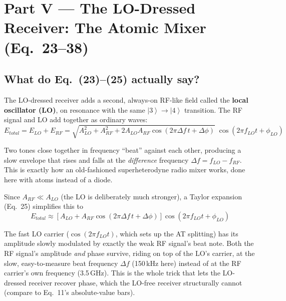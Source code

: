 \documentclass[11pt]{article}
\newcommand{\ket}[1]{\left|#1\right\rangle}
\begin{document}
\section{Part V --- The LO-Dressed Receiver: The Atomic Mixer (Eq.~23--38)}

\begin{center}
\end{center}

\subsection*{What do Eq.~(23)--(25) actually say?}
The LO-dressed receiver adds a second, always-on RF-like field called the \textbf{local oscillator (LO)}, on resonance with the same $\ket3\to\ket4$ transition. The RF signal and LO add together as ordinary waves:
\[
E_{total}=E_{LO}+E_{RF} = \sqrt{A_{LO}^2+A_{RF}^2+2A_{LO}A_{RF}\cos(2\pi\Delta f\,t+\Delta\phi)}\;\cos(2\pi f_{LO}t+\phi_{LO})
\]
\begin{plain}
Two tones close together in frequency ``beat'' against each other, producing a slow envelope that rises and falls at the \emph{difference} frequency $\Delta f=f_{LO}-f_{RF}$. This is exactly how an old-fashioned superheterodyne radio mixer works, done here with atoms instead of a diode.
\end{plain}
Since $A_{RF}\ll A_{LO}$ (the LO is deliberately much stronger), a Taylor expansion (Eq.~25) simplifies this to
\[
E_{total}\approx[A_{LO}+A_{RF}\cos(2\pi\Delta f\,t+\Delta\phi)]\cos(2\pi f_{LO}t+\phi_{LO})
\]
\begin{eqmeaning}
The fast LO carrier ($\cos(2\pi f_{LO}t)$, which sets up the AT splitting) has its amplitude slowly modulated by exactly the weak RF signal's beat note. Both the RF signal's amplitude \emph{and} phase survive, riding on top of the LO's carrier, at the slow, easy-to-measure beat frequency $\Delta f$ (150\,kHz here) instead of at the RF carrier's own frequency (3.5\,GHz). This is the whole trick that lets the LO-dressed receiver recover phase, which the LO-free receiver structurally cannot (compare to Eq.~11's absolute-value bars).
\end{eqmeaning}
\end{document}
